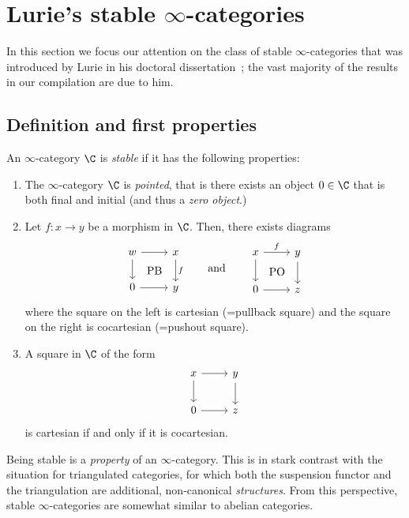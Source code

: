 \documentclass[a4paper]{amsart}
\begin{document}
\section{Lurie's stable $\infty$-categories}
\label{sec:stable-cats}

In this section we focus our attention on the class of stable
$\infty$-categories that was introduced by Lurie in his doctoral
dissertation~\cite{Lur04}; the vast majority of the results in our compilation
are due to him.

\subsection{Definition and first properties}

\begin{definition}
  An $\infty$-category $\C$ is \emph{stable} if it has the following properties:
  \begin{enumerate}
  \item The $\infty$-category $\C$ is \emph{pointed}, that is there exists an
    object $0\in\C$ that is both final and initial (and thus a \emph{zero
      object}.)
  \item Let $f\colon x\to y$ be a morphism in $\C$. Then, there exists diagrams
    \[
      \begin{tikzcd}
        w\rar\dar\ar[phantom]{dr}[description]{\text{PB}}&x\dar{f}\\
        0\rar&y
      \end{tikzcd}\qquad\text{and}\qquad%
      \begin{tikzcd}
        x\rar{f}\dar\ar[phantom]{dr}[description]{\text{PO}}&y\dar\\
        0\rar&z
      \end{tikzcd}
    \]
    where the square on the left is cartesian (=pullback square) and the square
    on the right is cocartesian (=pushout square).
  \item A square in $\C$ of the form
    \[
      \begin{tikzcd}
        x\rar\dar&y\dar\\
        0\rar&z
      \end{tikzcd}
    \]
    is cartesian if and only if it is cocartesian.
  \end{enumerate}
\end{definition}

\begin{remark}
  Being stable is a \emph{property} of an $\infty$-category. This is in stark
  contrast with the situation for triangulated categories, for which both the
  suspension functor and the triangulation are additional, non-canonical
  \emph{structures}. From this perspective, stable $\infty$-categories are
  somewhat similar to abelian categories.
\end{remark}
\end{document}
